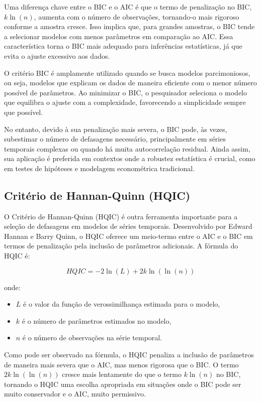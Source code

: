 \documentclass[12pt,oneside,a4paper,chapter=TITLE,english,brazil,sumario=abnt-6027-2012]{abntex2}
\begin{document}
Uma diferença chave entre o BIC e o AIC é que o termo de penalização no BIC, \( k \ln(n) \), aumenta com o número de observações, tornando-o mais rigoroso conforme a amostra cresce. Isso implica que, para grandes amostras, o BIC tende a selecionar modelos com menos parâmetros em comparação ao AIC. Essa característica torna o BIC mais adequado para inferências estatísticas, já que evita o ajuste excessivo aos dados.

O critério BIC é amplamente utilizado quando se busca modelos parcimoniosos, ou seja, modelos que explicam os dados de maneira eficiente com o menor número possível de parâmetros. Ao minimizar o BIC, o pesquisador seleciona o modelo que equilibra o ajuste com a complexidade, favorecendo a simplicidade sempre que possível.

No entanto, devido à sua penalização mais severa, o BIC pode, às vezes, subestimar o número de defasagens necessário, principalmente em séries temporais complexas ou quando há muita autocorrelação residual. Ainda assim, sua aplicação é preferida em contextos onde a robustez estatística é crucial, como em testes de hipóteses e modelagem econométrica tradicional.

\subsection{Critério de Hannan-Quinn (HQIC)}

O Critério de Hannan-Quinn (HQIC) é outra ferramenta importante para a seleção de defasagens em modelos de séries temporais. Desenvolvido por Edward Hannan e Barry Quinn, o HQIC oferece um meio-termo entre o AIC e o BIC em termos de penalização pela inclusão de parâmetros adicionais. A fórmula do HQIC é:

\[
	HQIC = -2 \ln(L) + 2k \ln(\ln(n))
\]

onde:

\begin{itemize}
	\item \( L \) é o valor da função de verossimilhança estimada para o modelo,
	\item \( k \) é o número de parâmetros estimados no modelo,
	\item \( n \) é o número de observações na série temporal.
\end{itemize}

Como pode ser observado na fórmula, o HQIC penaliza a inclusão de parâmetros de maneira mais severa que o AIC, mas menos rigorosa que o BIC. O termo \( 2k \ln(\ln(n)) \) cresce mais lentamente do que o termo \( k \ln(n) \) no BIC, tornando o HQIC uma escolha apropriada em situações onde o BIC pode ser muito conservador e o AIC, muito permissivo.
\end{document}
